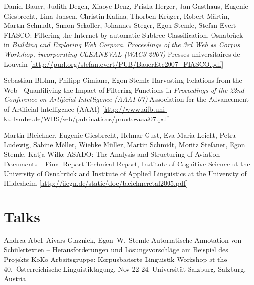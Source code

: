 \documentclass[11pt,a4paper]{moderncv}
\begin{document}
        {Daniel Bauer, Judith Degen, Xiaoye Deng, Priska Herger, Jan Gasthaus,
        Eugenie Giesbrecht, Lina Jansen, Christin Kalina, Thorben Kr{\"u}ger,
        Robert M{\"a}rtin, Martin Schmidt, Simon Scholler, Johannes Steger,
        Egon Stemle, Stefan Evert}
        {FIASCO: Filtering the Internet by automatic Subtree Classification,
        Osnabr{\"u}ck}
        {\small in {\em Building and Exploring Web Corpora. Proceedings of the
        3rd Web as Corpus Workshop, incorporating CLEANEVAL (WAC3-2007)}}
        {\small Presses universitaires de Louvain}
        {[\url{http://purl.org/stefan.evert/PUB/BauerEtc2007_FIASCO.pdf}]}
    
        {Sebastian Blohm, Philipp Cimiano, Egon Stemle}
        {Harvesting Relations from the Web - Quantifiying the Impact of
        Filtering Functions}
        {\small in {\em Proceedings of the 22nd Conference on Artificial
        Intelligence (AAAI-07)}}
        {\small Association for the Advancement of Artificial Intelligence
        (AAAI)}
        {[\url{http://www.aifb.uni-karlsruhe.de/WBS/seb/publications/pronto-aaai07.pdf}]}

        {Martin Bleichner, Eugenie Giesbrecht, Helmar Gust, Eva-Maria Leicht,
        Petra Ludewig, Sabine M{\"o}ller, Wiebke M{\"u}ller, Martin Schmidt,
        Moritz Stefaner, Egon Stemle, Katja Wilke}
        {ASADO: The Analysis and Structuring of Aviation Documents -- Final Report}
        {\small Technical Report, Institute of Cognitive Science at the
        University of Osnabr{\"u}ck and Institute of Applied Linguistics at the
        University of Hildesheim}
        {}
        {[\url{http://iiegn.de/static/doc/bleichneretal2005.pdf}]}

\closesection{}

\pagebreak
\section{Talks}
        {Andrea Abel, Aivars Glazniek, Egon~W.~Stemle}
        {\small Automatische Annotation von Schülertexten -- Herausforderungen
        und Lösungsvorschläge am Beispiel des Projekts KoKo}
        {\small Arbeitsgruppe: Korpusbasierte Linguistik} 
        {\small Workshop at the 40.~Österreichische Linguistiktagung, Nov
        22-24, Universität Salzburg, Salzburg, Austria}
        {}
\end{document}
